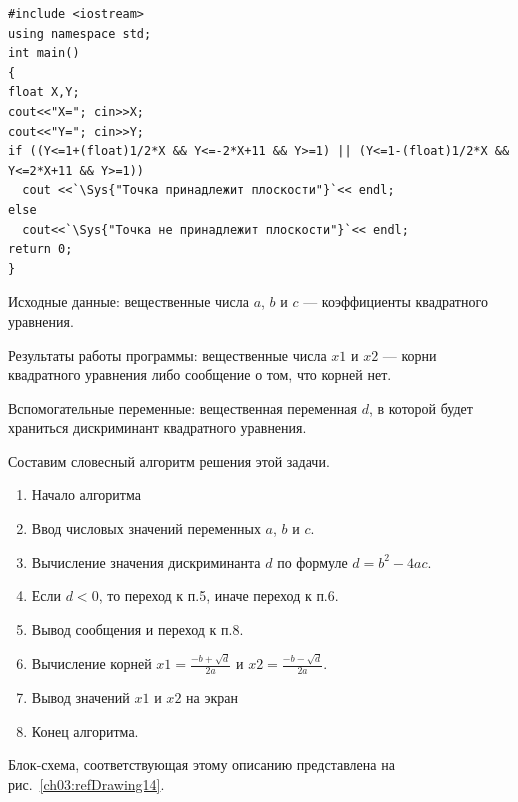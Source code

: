\begin{lstlisting}
#include <iostream>
using namespace std;
int main()
{
float X,Y;
cout<<"X="; cin>>X;
cout<<"Y="; cin>>Y;
if ((Y<=1+(float)1/2*X && Y<=-2*X+11 && Y>=1) || (Y<=1-(float)1/2*X && Y<=2*X+11 && Y>=1))
  cout <<`\Sys{"Точка принадлежит плоскости"}`<< endl;
else
  cout<<`\Sys{"Точка не принадлежит плоскости"}`<< endl;
return 0;
}
\end{lstlisting}


Исходные данные: вещественные числа $a$, $b$ и $c$ --- коэффициенты
квадратного уравнения.

Результаты работы программы: вещественные числа $x1$ и $x2$ --- корни квадратного
уравнения либо сообщение о том, что корней нет.

Вспомогательные переменные: вещественная переменная $d$, в которой будет храниться дискриминант
квадратного уравнения.

Составим словесный алгоритм решения этой задачи.
\begin{enumerate}
\item Начало алгоритма
\item Ввод числовых значений переменных $a$, $b$ и $c$.
\item Вычисление значения дискриминанта $d$ по формуле  $d=b^2-4ac$.
\item Если $d<0$, то переход к п.5, иначе переход к п.6.
\item Вывод сообщения  и переход к п.8.
\item Вычисление корней  $x1=\frac{-b+\sqrt{d}}{2a}$  и  $x2=\frac{-b-\sqrt{d}}{2a}$.
\item Вывод значений $x1$ и $x2$ на экран
\item Конец алгоритма.
\end{enumerate}
Блок-схема, соответствующая этому описанию представлена на рис.~\ref{ch03:refDrawing14}.

